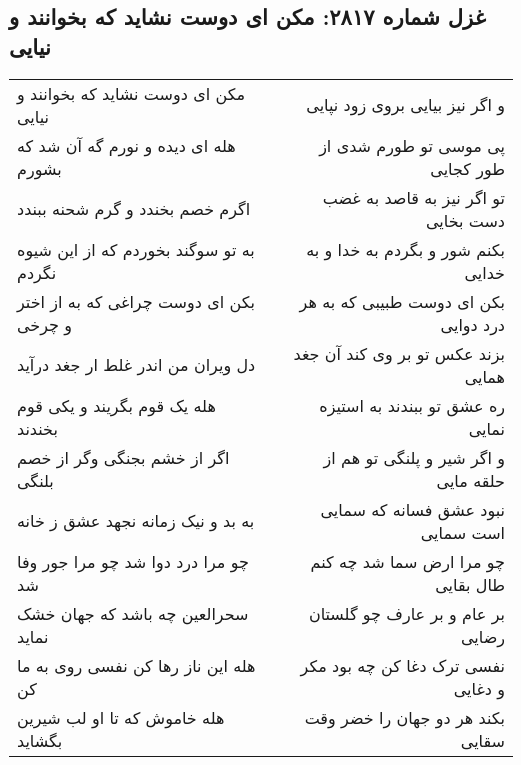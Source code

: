 \begin{center}
\section*{غزل شماره ۲۸۱۷: مکن ای دوست نشاید که بخوانند و نیایی}
\label{sec:2817}
\begin{longtable}{l p{0.5cm} r}
مکن ای دوست نشاید که بخوانند و نیایی
&&
و اگر نیز بیایی بروی زود نپایی
\\
هله ای دیده و نورم گه آن شد که بشورم
&&
پی موسی تو طورم شدی از طور کجایی
\\
اگرم خصم بخندد و گرم شحنه ببندد
&&
تو اگر نیز به قاصد به غضب دست بخایی
\\
به تو سوگند بخوردم که از این شیوه نگردم
&&
بکنم شور و بگردم به خدا و به خدایی
\\
بکن ای دوست چراغی که به از اختر و چرخی
&&
بکن ای دوست طبیبی که به هر درد دوایی
\\
دل ویران من اندر غلط ار جغد درآید
&&
بزند عکس تو بر وی کند آن جغد همایی
\\
هله یک قوم بگریند و یکی قوم بخندند
&&
ره عشق تو ببندند به استیزه نمایی
\\
اگر از خشم بجنگی وگر از خصم بلنگی
&&
و اگر شیر و پلنگی تو هم از حلقه مایی
\\
به بد و نیک زمانه نجهد عشق ز خانه
&&
نبود عشق فسانه که سمایی است سمایی
\\
چو مرا درد دوا شد چو مرا جور وفا شد
&&
چو مرا ارض سما شد چه کنم طال بقایی
\\
سحرالعین چه باشد که جهان خشک نماید
&&
بر عام و بر عارف چو گلستان رضایی
\\
هله این ناز رها کن نفسی روی به ما کن
&&
نفسی ترک دغا کن چه بود مکر و دغایی
\\
هله خاموش که تا او لب شیرین بگشاید
&&
بکند هر دو جهان را خضر وقت سقایی
\\
\end{longtable}
\end{center}
